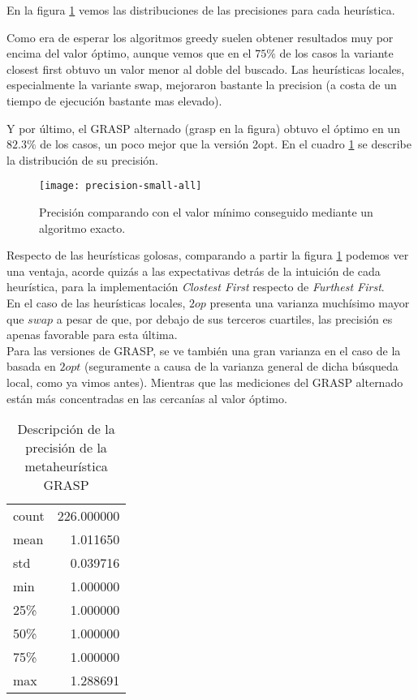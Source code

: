 En la figura \ref{fig:precision-small-all} vemos las distribuciones de las precisiones para cada heurística.

Como era de esperar los algoritmos greedy suelen obtener resultados muy por encima del valor óptimo, aunque vemos que en el $75\%$
de los casos la variante closest first obtuvo un valor menor al doble del buscado.
Las heurísticas locales, especialmente la variante swap, mejoraron bastante la precision (a costa de un tiempo de ejecución bastante mas elevado).

Y por último, el GRASP alternado (grasp en la figura) obtuvo el óptimo en un $82.3\%$ de los casos, un poco mejor que la versión 2opt.
En el cuadro \ref{tab:precision-small-grasp} se describe la distribución de su precisión.

\begin{figure}[H]
    \centering
    \texttt{[image: precision-small-all]}
    \caption{Precisión comparando con el valor mínimo conseguido mediante un algoritmo exacto.}
    \label{fig:precision-small-all}
\end{figure}

Respecto de las heurísticas golosas, comparando a partir la figura \ref{fig:precision-small-all} podemos ver una ventaja, acorde quizás a las expectativas detrás de la intuición de cada heurística, para la implementación \emph{Clostest First} respecto de \emph{Furthest First}.
\\

En el caso de las heurísticas locales,  $2op$ presenta una varianza muchísimo mayor que $swap$ a pesar de que, por debajo de sus terceros cuartiles, las precisión es apenas favorable para esta última.
\\

Para las versiones de GRASP, se ve también una gran varianza en el caso de la basada en $2opt$ (seguramente a causa de la varianza general de dicha búsqueda local, como ya vimos antes). Mientras que las mediciones del GRASP alternado están más concentradas en las cercanías al valor óptimo.

\begin{table}[H]
    \begin{center}
        \begin{tabular}{ l | r }
            count  & 226.000000 \\
            mean   &   1.011650 \\
            std    &   0.039716 \\
            min    &   1.000000 \\
            25\%   &   1.000000 \\
            50\%   &   1.000000 \\
            75\%   &   1.000000 \\
            max    &   1.288691 \\
        \end{tabular}
        \caption{Descripción de la precisión de la metaheurística GRASP}\label{tab:precision-small-grasp}
    \end{center}
\end{table}

